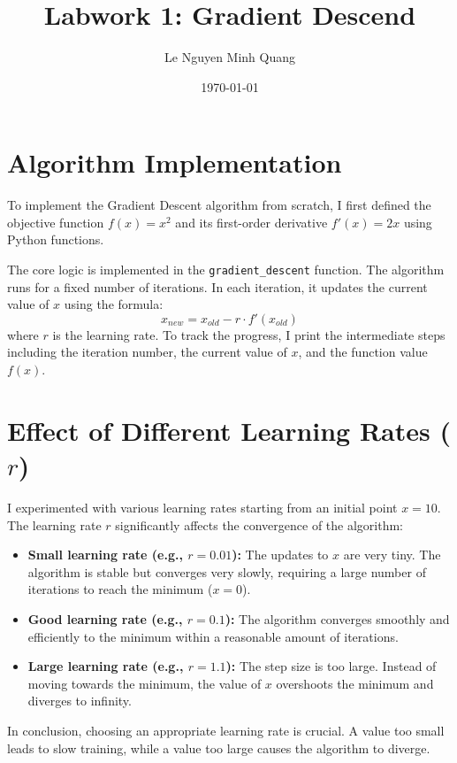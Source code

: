 \documentclass{article}
\title{Labwork 1: Gradient Descend}
\author{Le Nguyen Minh Quang}
\date{\today}
\begin{document}
\maketitle

\section{Algorithm Implementation}
To implement the Gradient Descent algorithm from scratch, I first defined the objective function $f(x) = x^2$ and its first-order derivative $f'(x) = 2x$ using Python functions. 

The core logic is implemented in the \texttt{gradient\_descent} function. The algorithm runs for a fixed number of iterations. In each iteration, it updates the current value of $x$ using the formula:
\begin{equation}
    x_{new} = x_{old} - r \cdot f'(x_{old})
\end{equation}
where $r$ is the learning rate. To track the progress, I print the intermediate steps including the iteration number, the current value of $x$, and the function value $f(x)$.

\section{Effect of Different Learning Rates ($r$)}
I experimented with various learning rates starting from an initial point $x = 10$. The learning rate $r$ significantly affects the convergence of the algorithm:

\begin{itemize}
    \item \textbf{Small learning rate (e.g., $r = 0.01$):} The updates to $x$ are very tiny. The algorithm is stable but converges very slowly, requiring a large number of iterations to reach the minimum ($x = 0$).
    \item \textbf{Good learning rate (e.g., $r = 0.1$):} The algorithm converges smoothly and efficiently to the minimum within a reasonable amount of iterations.
    \item \textbf{Large learning rate (e.g., $r = 1.1$):} The step size is too large. Instead of moving towards the minimum, the value of $x$ overshoots the minimum and diverges to infinity.
\end{itemize}

In conclusion, choosing an appropriate learning rate is crucial. A value too small leads to slow training, while a value too large causes the algorithm to diverge.
\end{document}

